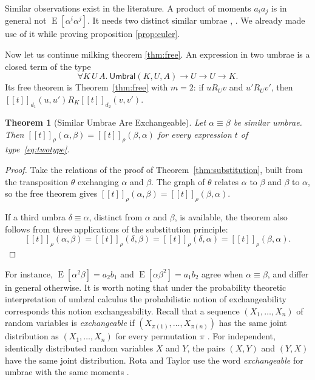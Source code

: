 \documentclass[11pt,a4paper]{report}
\theoremstyle{plain}
\newtheorem{theorem}{Theorem}[chapter]
\theoremstyle{definition}
\theoremstyle{remark}
\newcommand{\E}{\operatorname{E}}
\newcommand{\Umbral}{\mathsf{Umbral}}
\newcommand{\den}[2]{[\![#1]\!]_{#2}}
\begin{document}
Similar observations exist in the literature. A product of moments $a_i a_j$ is
in general not $\E[\alpha^i \alpha^j]$. It needs two distinct similar umbrae
\cite[\S2]{DiNardoSenatoKstat}, \cite[\S2.1]{DiNardoNiederhausenSenato}. We already made use 
of it while proving proposition \ref{prop:euler}.

Now let us continue milking theorem \ref{thm:free}.
An expression in two umbrae is a closed term of the type
\begin{equation}
\label{eq:twotype}
  \forall K\,U\,A.\ \Umbral(K, U, A) \to U \to U \to K .
\end{equation}
Its free theorem is Theorem~\ref{thm:free} with $m = 2$: if
$u \mathrel{R_U} v$ and $u' \mathrel{R_U} v'$, then
$\den{t}{d_1}(u, u') \mathrel{R_K} \den{t}{d_2}(v, v')$.

\begin{theorem}[Similar Umbrae Are Exchangeable]
\label{thm:exchange}
Let $\alpha \equiv \beta$ be similar umbrae. Then
$\den{t}{\rho}(\alpha, \beta) = \den{t}{\rho}(\beta, \alpha)$ for every expression
$t$ of type~\eqref{eq:twotype}.
\end{theorem}

\begin{proof}
Take the relations of the proof of Theorem~\ref{thm:substitution}, built from the
transposition $\theta$ exchanging $\alpha$ and $\beta$. The graph of $\theta$
relates $\alpha$ to $\beta$ and $\beta$ to $\alpha$, so the free theorem gives
$\den{t}{\rho}(\alpha, \beta) = \den{t}{\rho}(\beta, \alpha)$.

If a third umbra $\delta \equiv \alpha$, distinct from $\alpha$ and $\beta$, is
available, the theorem also follows from three applications of the substitution
principle:
\[
  \den{t}{\rho}(\alpha, \beta) = \den{t}{\rho}(\delta, \beta)
    = \den{t}{\rho}(\delta, \alpha) = \den{t}{\rho}(\beta, \alpha) .
\]
\end{proof}

For instance, $\E[\alpha^2\beta] = a_2 b_1$ and $\E[\alpha\beta^2] = a_1 b_2$
agree when $\alpha \equiv \beta$, and differ in general otherwise. It is worth
noting that under the probability theoretic interpretation of umbral calculus the
probabilistic notion of exchangeability corresponds this notion exchangeability. Recall 
that a sequence $(X_1, \dots, X_n)$ of random variables is \emph{exchangeable} if
$(X_{\pi(1)}, \dots, X_{\pi(n)})$ has the same joint distribution as
$(X_1, \dots, X_n)$ for every permutation $\pi$ \cite[\S1]{Aldous1985}. For
independent, identically distributed random variables $X$ and $Y$, the pairs
$(X, Y)$ and $(Y, X)$ have the same joint distribution. Rota and Taylor use the word
\emph{exchangeable} for umbrae with the same moments \cite[\S4]{Gessel2003}.
\end{document}

